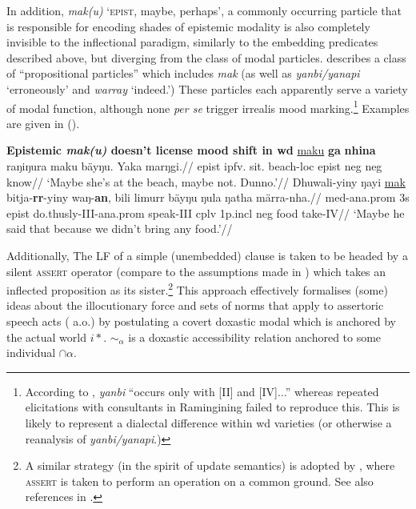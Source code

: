 In addition, \textit{mak(u)} `\textsc{epist, }maybe, perhaps', a commonly occurring particle that is responsible for encoding shades of epistemic modality is also completely invisible to the inflectional paradigm, similarly to the embedding predicates described above, but diverging from the class of modal particles. \citet[685]{Wilkinson1991} describes a class of ``propositional particles'' which includes \textit{mak} (as well as \textit{yanbi\slash{}yanapi} `erroneously' and \textit{warray} `indeed.') These particles each apparently serve a variety of modal function, although none \textit{per se} trigger irrealis mood marking.\footnote{According to \citet[686]{Wilkinson1991}, \textit{yanbi} ``occurs only with [\gls{II}] and [\gls{IV}]...'' whereas repeated elicitations with consultants in Ramingining failed to reproduce this. This is likely to represent a dialectal difference within \gls{wd} varieties (or otherwise a reanalysis of \textit{yanbi\slash{}yanapi}.)} Examples are given in ().

\pex\textbf{Epistemic \textit{mak(u)} doesn't license mood shift in \gls{wd}}
\a\begingl
\gla \ul{maku} \textbf{ga} \textbf{nhina} raŋiŋura maku bäyŋu. Yaka marŋgi.//
\glb \gls{epist} \gls{ipfv}.\I{} sit.\I{} beach-\gls{loc} \gls{epist} \gls{neg} \gls{neg} know//
\glft`Maybe she's at the beach, maybe not. Dunno.'\trailingcitation{[DB~20191416]}//\endgl
\a\begingl\gla Dhuwali-yiny ŋayi \ul{mak} bitja-\textbf{rr}-yiny waŋ-\textbf{an}, bili limurr bäyŋu ŋula ŋatha märra-nha.//
\glb \gls{med}-\gls{ana}.\gls{prom} 3s \gls{epist} do.thusly-\gls{III}-\gls{ana}.\gls{prom} speak-\gls{III} \gls{cplv} 1p.\gls{incl} \gls{neg} food take-\gls{IV}//
\glft`Maybe he said that because we didn't bring any food.'\trailingcitation{[\citetalias[Mathyu~16:7]{DB}]}//\endgl
\xe


Additionally, The LF of a simple (unembedded) clause is taken to be headed by a silent \textsc{assert} operator (compare to the assumptions made in \citealt{Hacquard2010,AlonsoBenito2015,Kaufmann2005}) which takes an inflected proposition as its sister.\footnote{A similar strategy (in the spirit of update semantics) is adopted by \citet[570]{Krifka2016}, where \textsc{assert} is taken to perform an operation on a common ground. See also references in \citet[102]{Hacquard2010}.} This approach effectively formalises (some) ideas about the illocutionary force and sets of norms that apply to assertoric speech acts (\citealp[e.g.][]{Williamson1996,Brandom1983} a.o.) by postulating a covert doxastic modal which is anchored by the actual world $ i* $. $ \sim_\alpha $ is a doxastic accessibility relation anchored to some individual $\cap\alpha $.

